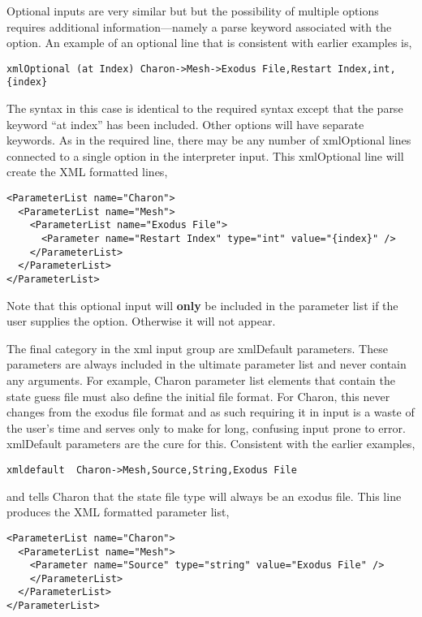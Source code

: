 Optional inputs are very similar but but the possibility of multiple
options requires additional information---namely a parse keyword
associated with the option.  An example of an optional line that is
consistent with earlier examples is,
\begin{lstlisting}
xmlOptional (at Index) Charon->Mesh->Exodus File,Restart Index,int,{index}
\end{lstlisting}
The syntax in this case is identical to the required syntax except
that the parse keyword ``at index'' has been included.  Other options
will have separate keywords.  As in the required line, there may be
any number of xmlOptional lines connected to a single option in the
interpreter input.  This xmlOptional line will create the XML
formatted lines,
\begin{lstlisting}
<ParameterList name="Charon">
  <ParameterList name="Mesh">
    <ParameterList name="Exodus File">
      <Parameter name="Restart Index" type="int" value="{index}" />
    </ParameterList>
  </ParameterList>
</ParameterList>
\end{lstlisting}
Note that this optional input will {\bf only} be included in the
parameter list if the user supplies the option.  Otherwise it will not
appear.

The final category in the xml input group are xmlDefault parameters.
These parameters are always included in the ultimate parameter list
and never contain any arguments.  For example, Charon parameter list
elements that contain the state guess file must also define the initial
file format.  For Charon, this never changes from the exodus file
format and as such requiring it in input is a waste of the user's time
and serves only to make for long, confusing input prone to error.
xmlDefault parameters are the cure for this.  Consistent with the
earlier examples,
\begin{lstlisting}
xmldefault  Charon->Mesh,Source,String,Exodus File
\end{lstlisting}
and tells Charon that the state file type will always be an exodus
file.  This line produces the XML formatted parameter list,
\begin{lstlisting}
<ParameterList name="Charon">
  <ParameterList name="Mesh">
    <Parameter name="Source" type="string" value="Exodus File" />
    </ParameterList>
  </ParameterList>
</ParameterList>
\end{lstlisting}

